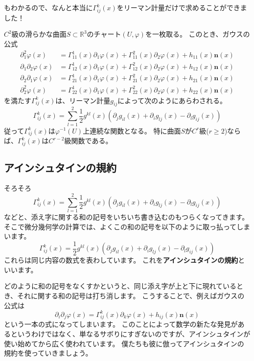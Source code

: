 もわかるので、なんと本当に$\Gamma_{ij}^k(x)$をリーマン計量だけで求めることができました！
\begin{theorem}
  $C^2$級の滑らかな曲面$S\subset\mathbb{R}^3$のチャート$(U,\varphi)$を一枚取る。
  このとき、ガウスの公式
  \begin{align*}
    \partial_1^2\varphi(x)&=\Gamma_{11}^1(x)\partial_1\varphi(x)+\Gamma_{11}^2(x)\partial_2\varphi(x)+h_{11}(x)\mathbf{n}(x)\\
    \partial_1\partial_2\varphi(x)&=\Gamma_{12}^1(x)\partial_1\varphi(x)+\Gamma_{12}^2(x)\partial_2\varphi(x)+h_{12}(x)\mathbf{n}(x)\\
    \partial_2\partial_1\varphi(x)&=\Gamma_{21}^1(x)\partial_1\varphi(x)+\Gamma_{21}^2(x)\partial_2\varphi(x)+h_{21}(x)\mathbf{n}(x)\\
    \partial_2^2\varphi(x)&=\Gamma_{22}^1(x)\partial_1\varphi(x)+\Gamma_{22}^2(x)\partial_2\varphi(x)+h_{22}(x)\mathbf{n}(x)
  \end{align*}
  を満たす$\Gamma_{ij}^k(x)$は、リーマン計量$g_{ij}$によって次のようにあらわされる。
  \[
    \Gamma_{ij}^k(x)=\sum_{l=1}^2\frac12g^{kl}(x)(\partial_jg_{il}(x)+\partial_ig_{lj}(x)-\partial_lg_{ij}(x))
  \]
  従って$\Gamma_{ij}^k(x)$は$\varphi^{-1}(U)$上連続な関数となる。
  特に曲面$S$が$C^r$級($r\geq2$)ならば、$\Gamma_{ij}^k(x)$は$C^{r-2}$級関数である。
\end{theorem}

\subsection{アインシュタインの規約}

そろそろ
\[
  \Gamma_{ij}^k(x)=\sum_{l=1}^2\frac12g^{kl}(x)(\partial_jg_{il}(x)+\partial_ig_{lj}(x)-\partial_lg_{ij}(x))
\]
などと、添え字に関する和の記号をいちいち書き込むのもつらくなってきます。
そこで微分幾何学の計算では、よくこの和の記号を以下のように取っ払ってしまいます。
\[
  \Gamma_{ij}^k(x)=\frac12g^{kl}(x)(\partial_jg_{il}(x)+\partial_ig_{lj}(x)-\partial_lg_{ij}(x))
\]
これらは同じ内容の数式を表わしています。
これを\textbf{アインシュタインの規約}といいます。

どのように和の記号をなくすかというと、同じ添え字が上と下に現れているとき、それに関する和の記号は打ち消します。
こうすることで、例えばガウスの公式は
\[
  \partial_i\partial_j\varphi(x)=\Gamma_{ij}^k(x)\partial_k\varphi(x)+h_{ij}(x)\mathbf{n}(x)
\]
という一本の式になってしまいます。
このことによって数学の新たな発見があるというわけではなく、単なるサボりにすぎないのですが、アインシュタインが使い始めてから広く使われています。
僕たちも彼に倣ってアインシュタインの規約を使っていきましょう。

